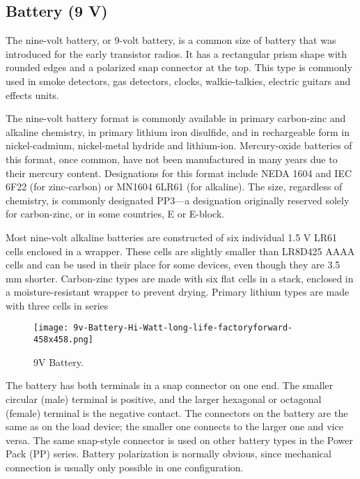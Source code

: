 \pagebreak
\subsection{Battery (9 V)}
The nine-volt battery, or 9-volt battery, is a common size of battery that was introduced for the early transistor radios. It has a rectangular prism shape with rounded edges and a polarized snap connector at the top. This type is commonly used in smoke detectors, gas detectors, clocks, walkie-talkies, electric guitars and effects units.\vspace{.3cm}

The nine-volt battery format is commonly available in primary carbon-zinc and alkaline chemistry, in primary lithium iron disulfide, and in rechargeable form in nickel-cadmium, nickel-metal hydride and lithium-ion. Mercury-oxide batteries of this format, once common, have not been manufactured in many years due to their mercury content. Designations for this format include NEDA 1604 and IEC 6F22 (for zinc-carbon) or MN1604 6LR61 (for alkaline). The size, regardless of chemistry, is commonly designated PP3—a designation originally reserved solely for carbon-zinc, or in some countries, E or E-block.\vspace{.3cm}

Most nine-volt alkaline batteries are constructed of six individual 1.5 V LR61 cells enclosed in a wrapper. These cells are slightly smaller than LR8D425 AAAA cells and can be used in their place for some devices, even though they are 3.5 mm shorter. Carbon-zinc types are made with six flat cells in a stack, enclosed in a moisture-resistant wrapper to prevent drying. Primary lithium types are made with three cells in series\vspace{.3cm}

\begin{figure}[h]
	\centering
	\texttt{[image: 9v-Battery-Hi-Watt-long-life-factoryforward-458x458.png]}
	\caption{9V Battery.}
\end{figure}
\vspace{.3cm}

The battery has both terminals in a snap connector on one end. The smaller circular (male) terminal is positive, and the larger hexagonal or octagonal (female) terminal is the negative contact. The connectors on the battery are the same as on the load device; the smaller one connects to the larger one and vice versa. The same snap-style connector is used on other battery types in the Power Pack (PP) series. Battery polarization is normally obvious, since mechanical connection is usually only possible in one configuration.

